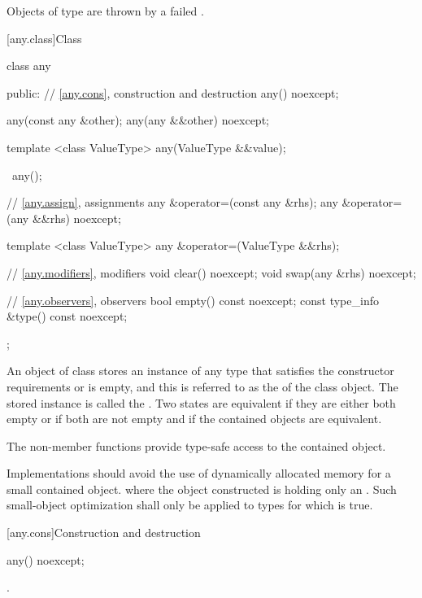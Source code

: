 \pnum
Objects of type  are thrown by a failed .

[any.class]{Class }

\begin{codeblock}
class any {
public:
  // \ref{any.cons}, construction and destruction
  any() noexcept;

  any(const any &other);
  any(any &&other) noexcept;

  template <class ValueType> any(ValueType &&value);

  ~any();

  // \ref{any.assign}, assignments
  any &operator=(const any &rhs);
  any &operator=(any &&rhs) noexcept;

  template <class ValueType> any &operator=(ValueType &&rhs);

  // \ref{any.modifiers}, modifiers
  void clear() noexcept;
  void swap(any &rhs) noexcept;

  // \ref{any.observers}, observers
  bool empty() const noexcept;
  const type_info &type() const noexcept;
};
\end{codeblock}

\pnum
An object of class  stores an instance of any type that satisfies the constructor requirements or is empty,
and this is referred to as the  of the class  object.
The stored instance is called the .
Two states are equivalent if they are either both empty or if both are not empty and if the contained objects are equivalent.

\pnum
The non-member  functions provide type-safe access to the contained object.

\pnum
Implementations should avoid the use of dynamically allocated memory for a small contained object.
\enterexample
where the object constructed is holding only an .
\exitexample
Such small-object optimization shall only be applied to types  for which
 is true.

[any.cons]{Construction and destruction}

\begin{itemdecl}
any() noexcept;
\end{itemdecl}

\begin{itemdescr}
\pnum
\postcondition
{}.
\end{itemdescr}

